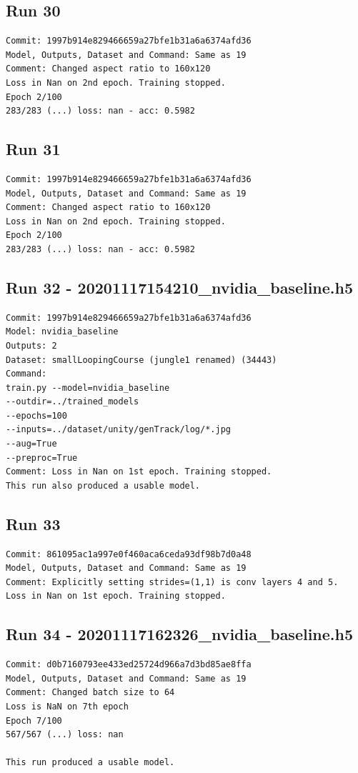 \subsection{Run 30}
\begin{verbatim}
Commit: 1997b914e829466659a27bfe1b31a6a6374afd36  
Model, Outputs, Dataset and Command: Same as 19
Comment: Changed aspect ratio to 160x120
Loss in Nan on 2nd epoch. Training stopped.
Epoch 2/100
283/283 (...) loss: nan - acc: 0.5982
\end{verbatim}

\subsection{Run 31}
\begin{verbatim}
Commit: 1997b914e829466659a27bfe1b31a6a6374afd36  
Model, Outputs, Dataset and Command: Same as 19
Comment: Changed aspect ratio to 160x120
Loss in Nan on 2nd epoch. Training stopped.
Epoch 2/100
283/283 (...) loss: nan - acc: 0.5982
\end{verbatim}

\subsection{Run 32 - 20201117154210\_nvidia\_baseline.h5}
\begin{verbatim}
Commit: 1997b914e829466659a27bfe1b31a6a6374afd36  
Model: nvidia_baseline
Outputs: 2
Dataset: smallLoopingCourse (jungle1 renamed) (34443)
Command: 
train.py --model=nvidia_baseline
--outdir=../trained_models
--epochs=100
--inputs=../dataset/unity/genTrack/log/*.jpg
--aug=True
--preproc=True
Comment: Loss in Nan on 1st epoch. Training stopped.
This run also produced a usable model.
\end{verbatim}

\subsection{Run 33}
\begin{verbatim}
Commit: 861095ac1a997e0f460aca6ceda93df98b7d0a48  
Model, Outputs, Dataset and Command: Same as 19
Comment: Explicitly setting strides=(1,1) is conv layers 4 and 5.
Loss in Nan on 1st epoch. Training stopped.
\end{verbatim}

\subsection{Run 34 - 20201117162326\_nvidia\_baseline.h5}
\begin{verbatim}
Commit: d0b7160793ee433ed25724d966a7d3bd85ae8ffa  
Model, Outputs, Dataset and Command: Same as 19
Comment: Changed batch size to 64
Loss is NaN on 7th epoch
Epoch 7/100
567/567 (...) loss: nan

This run produced a usable model.
\end{verbatim}

